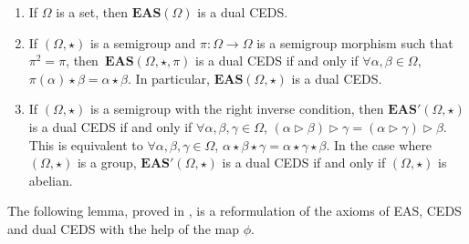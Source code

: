 \documentclass[10pt,a4paper]{amsart}
\numberwithin{equation}{section}
\newcommand{\eas}{\mathbf{EAS}}
\begin{document}
\begin{Example}\qquad
\begin{enumerate}\itemsep=0pt
 \item[(1)] If $\Omega$ is a set, then $\eas(\Omega)$ is a dual CEDS.
 \item[(2)] If $(\Omega,\star)$ is a semigroup and $\pi\colon\Omega\longrightarrow \Omega$ is a semigroup morphism such that $\pi^2=\pi$, then~${\eas(\Omega,\star,\pi)}$ is a dual CEDS if and only if
$
 \forall \alpha,\beta \in \Omega$, $\pi(\alpha)\star \beta =\alpha \star \beta$.
 In particular, $\eas(\Omega,\star)$ is a dual CEDS.
 \item[(3)] If $(\Omega,\star)$ is a semigroup with the right inverse condition, then $\eas'(\Omega,\star)$ is a dual CEDS if and only if
$\forall \alpha,\beta,\gamma \in \Omega$, $(\alpha \triangleright \beta) \triangleright \gamma =(\alpha \triangleright \gamma) \triangleright \beta$.
 This is equivalent to
$\forall \alpha,\beta,\gamma \in \Omega$, $\alpha \star \beta \star \gamma =\alpha \star \gamma \star \beta$.
 In the case where $(\Omega,\star)$ is a group, $\eas'(\Omega,\star)$ is a dual CEDS if and only if $(\Omega,\star)$ is abelian.
 \end{enumerate}\end{Example}

The following lemma, proved in \cite{Foissy48}, is a reformulation of the axioms of EAS, CEDS and dual CEDS with the help of the map $\phi$.
\end{document}

